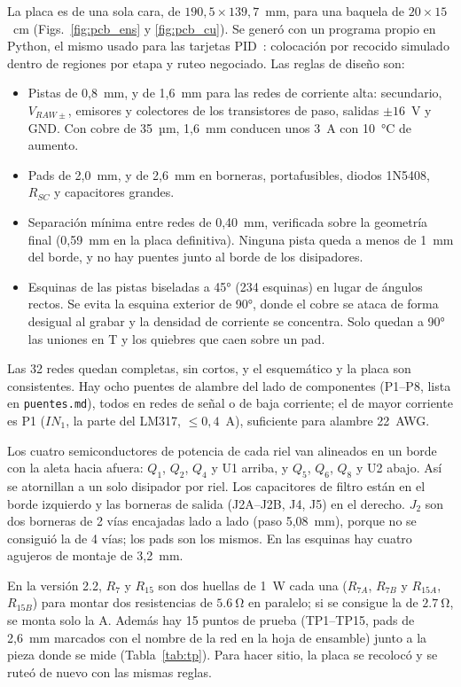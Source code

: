 La placa es de una sola cara, de $190{,}5\times139{,}7$~mm, para una baquela de $20\times15$~cm (Figs.~\ref{fig:pcb_ens} y \ref{fig:pcb_cu}). Se generó con un programa propio en Python, el mismo usado para las tarjetas PID~\cite{informepid}: colocación por recocido simulado dentro de regiones por etapa y ruteo negociado. Las reglas de diseño son:
\begin{itemize}
\item Pistas de 0,8~mm, y de 1,6~mm para las redes de corriente alta: secundario, $V_{RAW\pm}$, emisores y colectores de los transistores de paso, salidas $\pm16$~V y GND. Con cobre de 35~µm, 1,6~mm conducen unos 3~A con 10~°C de aumento.
\item Pads de 2,0~mm, y de 2,6~mm en borneras, portafusibles, diodos 1N5408, $R_{SC}$ y capacitores grandes.
\item Separación mínima entre redes de 0,40~mm, verificada sobre la geometría final (0,59~mm en la placa definitiva). Ninguna pista queda a menos de 1~mm del borde, y no hay puentes junto al borde de los disipadores.
\item Esquinas de las pistas biseladas a 45° (234 esquinas) en lugar de ángulos rectos. Se evita la esquina exterior de 90°, donde el cobre se ataca de forma desigual al grabar y la densidad de corriente se concentra. Solo quedan a 90° las uniones en T y los quiebres que caen sobre un pad.
\end{itemize}
Las 32 redes quedan completas, sin cortos, y el esquemático y la placa son consistentes. Hay ocho puentes de alambre del lado de componentes (P1--P8, lista en \texttt{puentes.md}), todos en redes de señal o de baja corriente; el de mayor corriente es P1 ($IN_1$, la parte del LM317, $\leq0{,}4$~A), suficiente para alambre 22~AWG.

Los cuatro semiconductores de potencia de cada riel van alineados en un borde con la aleta hacia afuera: $Q_1$, $Q_2$, $Q_4$ y U1 arriba, y $Q_5$, $Q_6$, $Q_8$ y U2 abajo. Así se atornillan a un solo disipador por riel. Los capacitores de filtro están en el borde izquierdo y las borneras de salida (J2A--J2B, J4, J5) en el derecho. $J_2$ son dos borneras de 2 vías encajadas lado a lado (paso 5,08~mm), porque no se consiguió la de 4 vías; los pads son los mismos. En las esquinas hay cuatro agujeros de montaje de 3,2~mm.

En la versión 2.2, $R_7$ y $R_{15}$ son dos huellas de 1~W cada una ($R_{7A}$, $R_{7B}$ y $R_{15A}$, $R_{15B}$) para montar dos resistencias de $\SI{5,6}{\ohm}$ en paralelo; si se consigue la de $\SI{2,7}{\ohm}$, se monta solo la A. Además hay 15 puntos de prueba (TP1--TP15, pads de 2,6~mm marcados con el nombre de la red en la hoja de ensamble) junto a la pieza donde se mide (Tabla~\ref{tab:tp}). Para hacer sitio, la placa se recolocó y se ruteó de nuevo con las mismas reglas.

